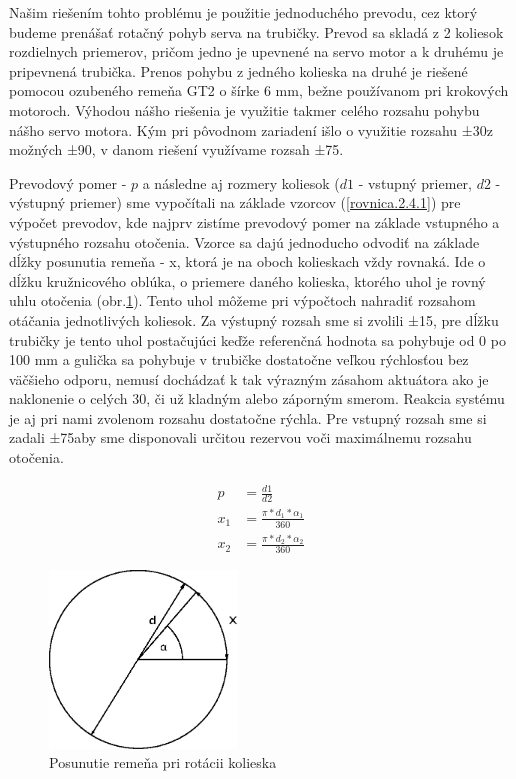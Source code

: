 Našim riešením tohto problému je použitie jednoduchého prevodu, cez ktorý budeme prenášať rotačný pohyb serva na trubičky. Prevod sa skladá z 2 koliesok rozdielnych priemerov, pričom jedno je upevnené na servo motor a k druhému je pripevnená trubička. Prenos pohybu z jedného kolieska na druhé je riešené pomocou ozubeného remeňa GT2 o šírke 6 mm, bežne používanom pri krokových motoroch. Výhodou nášho riešenia je využitie takmer celého rozsahu pohybu nášho servo motora. Kým pri pôvodnom zariadení išlo o využitie rozsahu ±30\textdegree z možných ±90\textdegree,  v danom riešení využívame rozsah ±75\textdegree.

Prevodový pomer - $p$ a následne aj rozmery koliesok ($d1$ - vstupný priemer, $d2$ - výstupný priemer) sme vypočítali na základe vzorcov (\ref{rovnica.2.4.1}) pre výpočet prevodov, kde najprv zistíme prevodový pomer na základe vstupného a výstupného rozsahu otočenia. Vzorce sa dajú jednoducho odvodiť na základe dĺžky posunutia remeňa - x, ktorá je na oboch kolieskach vždy rovnaká. Ide o dĺžku kružnicového oblúka, o priemere daného kolieska, ktorého uhol je rovný uhlu otočenia (obr.\ref{OBRAZOK 2.4.1}). Tento uhol môžeme pri výpočtoch nahradiť rozsahom otáčania jednotlivých koliesok.  Za výstupný rozsah sme si zvolili ±15\textdegree, pre dĺžku trubičky je tento uhol postačujúci keďže referenčná hodnota sa pohybuje od 0 po 100 mm a gulička sa pohybuje v trubičke dostatočne veľkou rýchlosťou bez väčšieho odporu, nemusí dochádzať k tak výrazným zásahom aktuátora ako je naklonenie o celých 30\textdegree, či už kladným alebo záporným smerom.  Reakcia systému je aj pri nami zvolenom rozsahu dostatočne rýchla. Pre vstupný rozsah sme si zadali ±75\textdegree aby sme disponovali určitou rezervou voči maximálnemu rozsahu otočenia.



\begin{align}
	\label{rovnica.2.4.1}
	p &= \frac{d1}{d2} \\
	x_1&=\frac{\pi*d_1*\alpha_1}{360} \\
	x_2&=\frac{\pi*d_2*\alpha_2}{360}
\end{align}

\begin{figure}[!h]
	\centering
	\includegraphics[width=50mm]{obr/prevod.eps}
	\caption{Posunutie remeňa pri rotácii kolieska}\label{OBRAZOK 2.4.1} 
\end{figure} 

